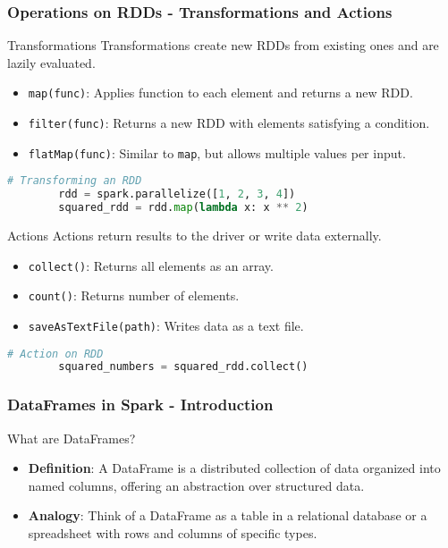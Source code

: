 \documentclass[aspectratio=169]{beamer}
\begin{document}
\begin{frame}[fragile]
    \frametitle{Operations on RDDs - Transformations and Actions}
    \begin{block}{Transformations}
        Transformations create new RDDs from existing ones and are lazily evaluated.
        \begin{itemize}
            \item \texttt{map(func)}: Applies function to each element and returns a new RDD.
            \item \texttt{filter(func)}: Returns a new RDD with elements satisfying a condition.
            \item \texttt{flatMap(func)}: Similar to \texttt{map}, but allows multiple values per input.
        \end{itemize}
        \begin{lstlisting}[language=Python]
        # Transforming an RDD
        rdd = spark.parallelize([1, 2, 3, 4])
        squared_rdd = rdd.map(lambda x: x ** 2)
        \end{lstlisting}
    \end{block}
    
    \begin{block}{Actions}
        Actions return results to the driver or write data externally.
        \begin{itemize}
            \item \texttt{collect()}: Returns all elements as an array.
            \item \texttt{count()}: Returns number of elements.
            \item \texttt{saveAsTextFile(path)}: Writes data as a text file.
        \end{itemize}
        \begin{lstlisting}[language=Python]
        # Action on RDD
        squared_numbers = squared_rdd.collect()
        \end{lstlisting}
    \end{block}
\end{frame}

\begin{frame}[fragile]
    \frametitle{DataFrames in Spark - Introduction}
    \begin{block}{What are DataFrames?}
        \begin{itemize}
            \item \textbf{Definition}: A DataFrame is a distributed collection of data organized into named columns, offering an abstraction over structured data.
            \item \textbf{Analogy}: Think of a DataFrame as a table in a relational database or a spreadsheet with rows and columns of specific types.
        \end{itemize}
    \end{block}
\end{frame}
\end{document}
